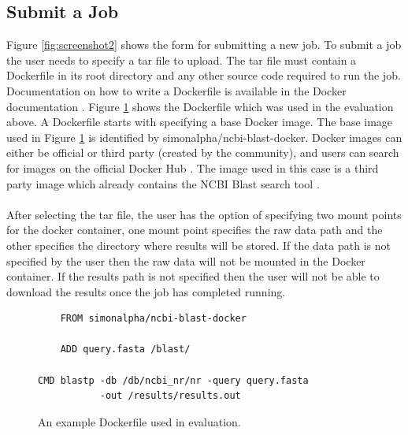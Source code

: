 \documentclass{sig-alternate-05-2015}
\begin{document}
\subsection{Submit a Job}
Figure \ref{fig:screenshot2} shows the form for submitting a new job. 
To submit a job the user needs to specify a tar file to upload. The tar file must contain a Dockerfile in its root directory and any other source code required to run the job. Documentation on how to write a Dockerfile is available in the Docker documentation \cite{dockerfile}. Figure \ref{fig:dockerfile} shows the Dockerfile which was used in the evaluation above. A Dockerfile starts with specifying a base Docker image. The base image used in Figure \ref{fig:dockerfile} is identified by simonalpha/ncbi-blast-docker. Docker images can either be official or third party (created by the community), and users can search for images on the official Docker Hub \cite{dockerhub}. The image used in this case is a third party image which already contains the NCBI Blast search tool \cite{dockerblast}.
\\\\
After selecting the tar file, the user has the option of specifying two mount points for the docker container, one mount point specifies the raw data path and the other specifies the directory where results will be stored. If the data path is not specified by the user then the raw data will not be mounted in the Docker container. If the results path is not specified then the user will not be able to download the results once the job has completed running.

\begin{figure}
	\begin{verbatim}
	FROM simonalpha/ncbi-blast-docker

	ADD query.fasta /blast/

CMD blastp -db /db/ncbi_nr/nr -query query.fasta 
           -out /results/results.out
	\end{verbatim}
	\caption{An example Dockerfile used in evaluation.}
\label{fig:dockerfile}
\end{figure}
\end{document}
